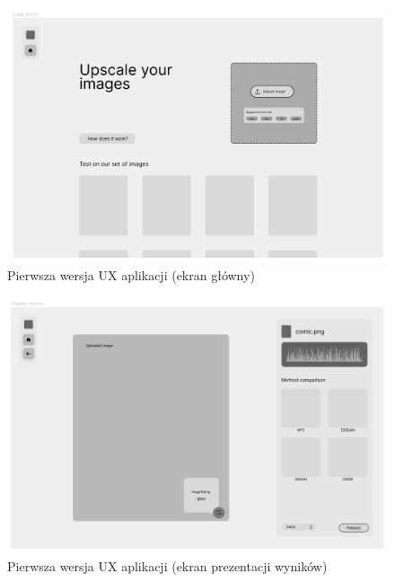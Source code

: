 \begin{figure}[ht]
    \centering
    \begin{minipage}[t]{0.8\linewidth}
        \includegraphics[width=\linewidth]{Rozdziały/06.Aplikacja/Obrazy/UX upload.png}  
        \caption{Pierwsza wersja UX aplikacji (ekran główny)}
        \label{fig:image83}
    \end{minipage}
\end{figure}

\begin{figure}[ht]
    \centering
    \begin{minipage}[t]{0.8\linewidth}
        \includegraphics[width=\linewidth]{Rozdziały/06.Aplikacja/Obrazy/UX display.png}  
        \caption{Pierwsza wersja UX aplikacji (ekran prezentacji wyników)}
        \label{fig:image84}
    \end{minipage}
\end{figure}

